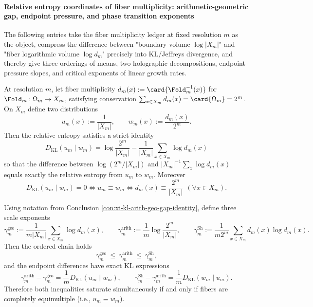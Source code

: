 
\paragraph{Relative entropy coordinates of fiber multiplicity: arithmetic-geometric gap, endpoint pressure, and phase transition exponents}
The following entries take the fiber multiplicity ledger at fixed resolution \(m\) as the object, compress the difference between "boundary volume \(\log|X_m|\)" and "fiber logarithmic volume \(\log d_m\)" precisely into KL/Jeffreys divergence,
and thereby give three orderings of means, two holographic decompositions, endpoint pressure slopes, and critical exponents of linear growth rates.

\begin{conclusion}\label{con:xi-kl-arith-geo-gap-identity}
At resolution \(m\), let fiber multiplicity \(d_m(x):=\card{\Fold_m^{-1}(x)}\) for \(\Fold_m:\Omega_m\to X_m\), satisfying conservation
\(
\sum_{x\in X_m} d_m(x)=\card{\Omega_m}=2^m
\).
On \(X_m\) define two distributions
\[
u_m(x):=\frac{1}{|X_m|},
\qquad
w_m(x):=\frac{d_m(x)}{2^m}.
\]
Then the relative entropy satisfies a strict identity
\[
\boxed{\;
D_{\mathrm{KL}}(u_m\mid w_m)
=\log\frac{2^m}{|X_m|}
-\frac{1}{|X_m|}\sum_{x\in X_m}\log d_m(x)\;}
\]
so that the difference between
\(
\log(2^m/|X_m|)
\)
and
\(
|X_m|^{-1}\sum_x \log d_m(x)
\)
equals exactly the relative entropy from \(u_m\) to \(w_m\).
Moreover
\[
D_{\mathrm{KL}}(u_m\mid w_m)=0
\iff
u_m\equiv w_m
\iff
d_m(x)\equiv \frac{2^m}{|X_m|}\ \ (\forall x\in X_m).
\]
\end{conclusion}

\begin{conclusion}\label{con:xi-logd-three-average-chain-kl}
Using notation from Conclusion \ref{con:xi-kl-arith-geo-gap-identity}, define three scale exponents
\[
\gamma_m^{\mathrm{geo}}
:=\frac{1}{m|X_m|}\sum_{x\in X_m}\log d_m(x),
\qquad
\gamma_m^{\mathrm{arith}}
:=\frac{1}{m}\log\frac{2^m}{|X_m|},
\qquad
\gamma_m^{\mathrm{Sh}}
:=\frac{1}{m2^m}\sum_{x\in X_m}d_m(x)\log d_m(x).
\]
Then the ordered chain holds
\[
\gamma_m^{\mathrm{geo}}\ \le\ \gamma_m^{\mathrm{arith}}\ \le\ \gamma_m^{\mathrm{Sh}},
\]
and the endpoint differences have exact KL expressions
\[
\gamma_m^{\mathrm{arith}}-\gamma_m^{\mathrm{geo}}=\frac{1}{m}D_{\mathrm{KL}}(u_m\mid w_m),
\qquad
\gamma_m^{\mathrm{Sh}}-\gamma_m^{\mathrm{arith}}=\frac{1}{m}D_{\mathrm{KL}}(w_m\mid u_m).
\]
Therefore both inequalities saturate simultaneously if and only if fibers are completely equimultiple (i.e., \(u_m\equiv w_m\)).
\end{conclusion}

